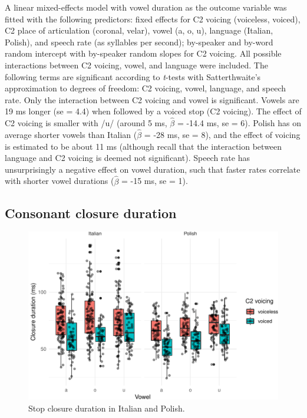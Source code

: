 \documentclass[preprint]{JASAnew}
\begin{document}
A linear mixed-effects model with vowel duration as the outcome variable
was fitted with the following predictors: fixed effects for C2 voicing
(voiceless, voiced), C2 place of articulation (coronal, velar), vowel
(a, o, u), language (Italian, Polish), and speech rate (as syllables per
second); by-speaker and by-word random intercept with by-speaker random
slopes for C2 voicing. All possible interactions between C2 voicing,
vowel, and language were included. The following terms are significant
according to \emph{t}-tests with Satterthwaite's approximation to
degrees of freedom: C2 voicing, vowel, language, and speech rate. Only
the interaction between C2 voicing and vowel is significant. Vowels are
19 ms longer (se = 4.4) when followed by a voiced stop (C2 voicing). The
effect of C2 voicing is smaller with /u/ (around 5 ms, \(\hat{\beta}\) =
-14.4 ms, se = 6). Polish has on average shorter vowels than Italian
(\(\hat{\beta}\) = -28 ms, se = 8), and the effect of voicing is
estimated to be about 11 ms (although recall that the interaction
between language and C2 voicing is deemed not significant). Speech rate
has unsurprisingly a negative effect on vowel duration, such that faster
rates correlate with shorter vowel durations (\(\hat{\beta}\) = -15 ms,
se = 1).

\hypertarget{consonant-closure-duration}{%
\subsection{Consonant closure
duration}\label{consonant-closure-duration}}

\begin{figure}
\includegraphics{2018-jasa_files/figure-latex/closure-plot-1} \caption{Stop closure duration in Italian and Polish.}\label{f:closure-plot}
\end{figure}
\end{document}
